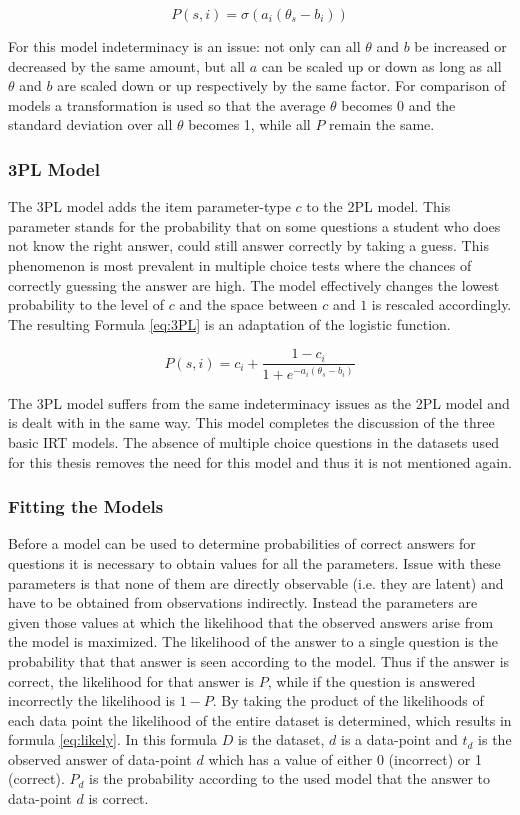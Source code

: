 \documentclass{scrartcl}
\begin{document}
\begin{equation}
\label{eq:2pl}
P(s,i) = \sigma(a_{i} (\theta_{s} - b_{i}))
\end{equation}

For this model indeterminacy is an issue: not only can all $\theta$ and $b$ be increased or decreased by the same amount, but all $a$ can be scaled up or down as long as all $\theta$ and $b$ are scaled down or up respectively by the same factor. For comparison of models a transformation is used so that the average $\theta$ becomes 0 and the standard deviation over all $\theta$ becomes 1, while all $P$ remain the same. 

\subsubsection{3PL Model}
The 3PL model adds the item parameter-type $c$ to the 2PL model. This parameter stands for the probability that on some questions a student who does not know the right answer, could still answer correctly by taking a guess. This phenomenon is most prevalent in multiple choice tests where the chances of correctly guessing the answer are high. The model effectively changes the lowest probability to the level of $c$ and the space between $c$ and $1$ is rescaled accordingly. The resulting Formula \ref{eq:3PL} is an adaptation of the logistic function.

\begin{equation}
\label{eq:3PL}
P(s,i)= c_{i} + \frac{1-c_{i}}{1+e^{-a_{i}(\theta_{s} - b_{i})}}
\end{equation}

The 3PL model suffers from the same indeterminacy issues as the 2PL model and is dealt with in the same way. This model completes the discussion of the three basic IRT models. The absence of multiple choice questions in the datasets used for this thesis removes the need for this model and thus it is not mentioned again. 

\subsubsection{Fitting the Models}
Before a model can be used to determine probabilities of correct answers for questions it is necessary to obtain values for all the parameters. Issue with these parameters is that none of them are directly observable (i.e. they are latent) and have to be obtained from observations indirectly. Instead the parameters are given those values at which the likelihood that the observed answers arise from the model is maximized. The likelihood of the answer to a single question is the probability that that answer is seen according to the model. Thus if the answer is correct, the likelihood for that answer is $P$, while if the question is answered incorrectly the likelihood is $1-P$. By taking the product of the likelihoods of each data point the likelihood of the entire dataset is determined, which results in formula \ref{eq:likely}. In this formula $D$ is the dataset, $d$ is a data-point and $t_{d}$ is the observed answer of data-point $d$ which has a value of either 0 (incorrect) or 1 (correct). $P_{d}$ is the probability according to the used model that the answer to data-point $d$ is correct.
\end{document}
